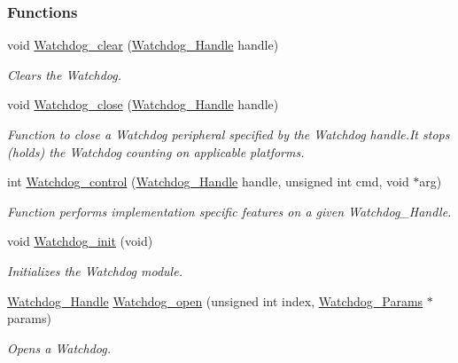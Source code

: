 \subsubsection*{Functions}
\begin{DoxyCompactItemize}
\item 
void \hyperlink{_watchdog_8h_a396decd6b1807db10c636f9987c3be4c}{Watchdog\+\_\+clear} (\hyperlink{_watchdog_8h_a00ed22749c947ef200434eeec507f90d}{Watchdog\+\_\+\+Handle} handle)
\begin{DoxyCompactList}\small\item\em Clears the Watchdog. \end{DoxyCompactList}\item 
void \hyperlink{_watchdog_8h_a1c0dfea7011b06f303d01afb631ffbdd}{Watchdog\+\_\+close} (\hyperlink{_watchdog_8h_a00ed22749c947ef200434eeec507f90d}{Watchdog\+\_\+\+Handle} handle)
\begin{DoxyCompactList}\small\item\em Function to close a Watchdog peripheral specified by the Watchdog handle.\+It stops (holds) the Watchdog counting on applicable platforms. \end{DoxyCompactList}\item 
int \hyperlink{_watchdog_8h_aa98a75361edb1e476432669169f2950e}{Watchdog\+\_\+control} (\hyperlink{_watchdog_8h_a00ed22749c947ef200434eeec507f90d}{Watchdog\+\_\+\+Handle} handle, unsigned int cmd, void $\ast$arg)
\begin{DoxyCompactList}\small\item\em Function performs implementation specific features on a given Watchdog\+\_\+\+Handle. \end{DoxyCompactList}\item 
void \hyperlink{_watchdog_8h_afaadfb59be17661ae95562f2081355e7}{Watchdog\+\_\+init} (void)
\begin{DoxyCompactList}\small\item\em Initializes the Watchdog module. \end{DoxyCompactList}\item 
\hyperlink{_watchdog_8h_a00ed22749c947ef200434eeec507f90d}{Watchdog\+\_\+\+Handle} \hyperlink{_watchdog_8h_aa5ce656aa6d5199e1efdb4ca2cd9fb7c}{Watchdog\+\_\+open} (unsigned int index, \hyperlink{struct_watchdog___params}{Watchdog\+\_\+\+Params} $\ast$params)
\begin{DoxyCompactList}\small\item\em Opens a Watchdog. \end{DoxyCompactList}\item 

\end{DoxyCompactItemize}
